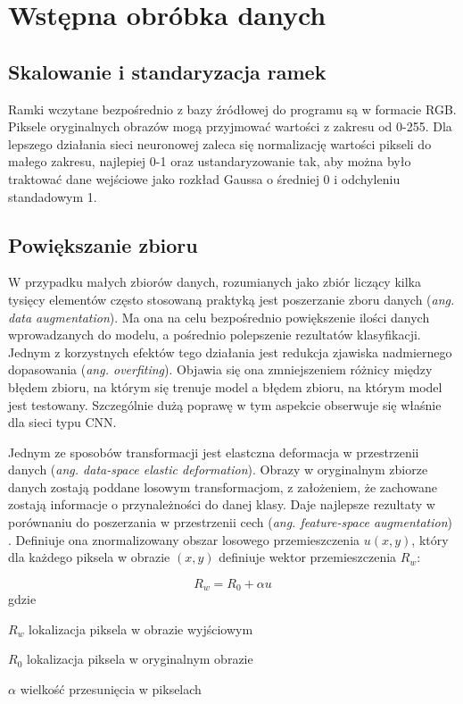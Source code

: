 \section{Wstępna obróbka danych}
\subsection{Skalowanie i standaryzacja ramek}
Ramki wczytane bezpośrednio z bazy źródłowej do programu są w formacie RGB. Piksele oryginalnych obrazów mogą przyjmować wartości z zakresu od 0-255. Dla lepszego działania sieci neuronowej zaleca się normalizację wartości pikseli do małego zakresu, najlepiej 0-1 oraz ustandaryzowanie tak, aby można było traktować dane wejściowe jako rozkład Gaussa o średniej 0 i odchyleniu standadowym 1.

\subsection{Powiększanie zbioru}
W przypadku małych zbiorów danych, rozumianych jako zbiór liczący kilka tysięcy elementów często stosowaną praktyką jest poszerzanie zboru danych (\textit{ang. data augmentation}). Ma ona na celu bezpośrednio powiększenie ilości danych wprowadzanych do modelu, a pośrednio polepszenie rezultatów klasyfikacji. Jednym z korzystnych efektów tego działania jest redukcja zjawiska nadmiernego dopasowania (\textit{ang. overfiting}). Objawia się ona zmniejszeniem różnicy między błędem zbioru, na którym się trenuje model a błędem zbioru, na którym model jest testowany. Szczególnie dużą poprawę w tym aspekcie obserwuje się właśnie dla sieci typu CNN. \cite{augmentation}

Jednym ze sposobów transformacji jest elastczna deformacja w przestrzenii danych (\textit{ang. data-space elastic deformation}). Obrazy w oryginalnym zbiorze danych zostają poddane losowym transformacjom, z założeniem, że zachowane zostają informacje o przynależności do danej klasy. Daje najlepsze rezultaty w porównaniu do poszerzania w przestrzenii cech (\textit{ang. feature-space augmentation}) \cite{augmentation}. Definiuje ona znormalizowany obszar losowego przemieszczenia \(u(x,y)\), który dla każdego piksela w obrazie \((x,y)\) definiuje wektor przemieszczenia \(R_w\):

\begin{equation}
R_w = R_0 + \alpha u
\end{equation}
gdzie
\begin{eqwhere}[2cm]
	\item[$R_w$] lokalizacja piksela w obrazie wyjściowym
	\item[$R_0$] lokalizacja piksela w oryginalnym obrazie
	\item[$\alpha$] wielkość przesunięcia w pikselach
\end{eqwhere}

